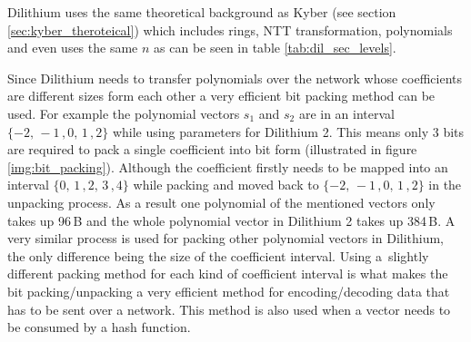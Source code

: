 Dilithium uses the same theoretical background as Kyber (see section \ref{sec:kyber_theroteical}) which includes rings, NTT transformation, polynomials and even uses the same $n$ as can be seen in table \ref{tab:dil_sec_levels}.


Since Dilithium needs to transfer polynomials over the network whose coefficients are different sizes form each other a very efficient bit packing method can be used. For example the polynomial vectors $s_1$ and $s_2$ are in an interval $\{-2,\,-1\,,0,\,1\,,2\}$ while using parameters for Dilithium 2. This means only 3 bits are required to pack a single coefficient into bit form (illustrated in figure \ref{img:bit_packing}). Although the coefficient firstly needs to be mapped into an interval $\{0,\,1\,,2,\,3\,,4\}$ while packing and moved back to $\{-2,\,-1\,,0,\,1\,,2\}$ in the unpacking process. As a result one polynomial of the mentioned vectors only takes up 96\,B and the whole polynomial vector in Dilithium 2 takes up 384\,B. A very similar process is used for packing other polynomial vectors in Dilithium, the only difference being the size of the coefficient interval. Using a~slightly different packing method for each kind of coefficient interval is what makes the bit packing/unpacking a very efficient method for encoding/decoding data that has to be sent over a network. This method is also used when a vector needs to be consumed by a hash function.
